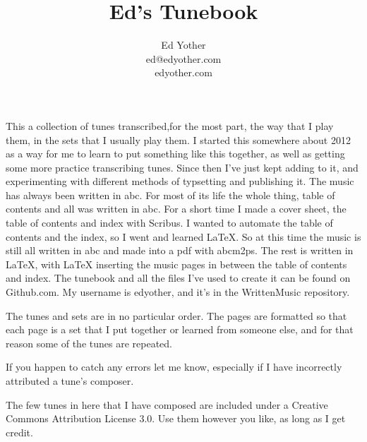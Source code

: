 \documentclass[11pt,letterpaper]{article}
\begin{document}

\title{Ed's Tunebook}
\author{Ed Yother\\ed@edyother.com\\edyother.com}
\maketitle

This a collection of tunes transcribed,for the most part, the way that I play them, in the sets that I usually play them. I started this somewhere about 2012 as a way for me to learn to put something like this together, as well as getting some more practice transcribing tunes. Since then I've just kept adding to it, and experimenting with different methods of typsetting and publishing it. The music has always been written in abc. For most of its life the whole thing, table of contents and all was written in abc. For a short time I made a cover sheet, the table of contents and index with Scribus. I wanted to automate the table of contents and the index, so I went and learned LaTeX. So at this time the music is still all written in abc and made into a pdf with abcm2ps. The rest is written in LaTeX, with LaTeX inserting the music pages in between the table of contents and index. The tunebook and all the files I've used to create it can be found on Github.com. My username is edyother, and it's in the WrittenMusic repository. 

The tunes and sets are in no particular order. The pages are formatted so that each page is a set that I put together or learned from someone else, and for that reason some of the tunes are repeated.

If you happen to catch any errors let me know, especially if I have incorrectly attributed a tune's composer.

The few tunes in here that I have composed are included under a Creative Commons Attribution License 3.0. Use them however you like, as long as I get credit.

\pagebreak
\tableofcontents

\newpage
{}



\setcounter{page}{1}


\end{document}
